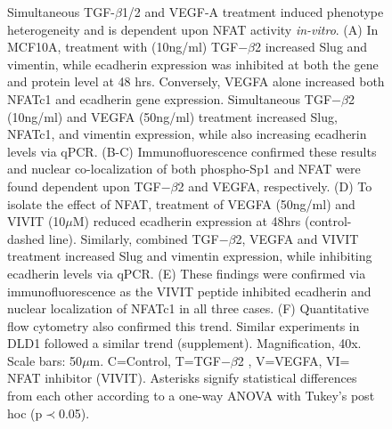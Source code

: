 \documentclass[11pt,letterpaper]{article}
\begin{document}
\clearpage

\begin{figure}
\caption{Simultaneous TGF-$\beta$1/2 and VEGF-A treatment induced phenotype heterogeneity and is dependent upon NFAT activity \emph{in-vitro}.  (A) In MCF10A, treatment with (10ng/ml) TGF$-\beta$2 increased Slug and vimentin, while ecadherin expression was inhibited at both the gene and protein level at 48 hrs.  Conversely, VEGFA alone increased both NFATc1 and ecadherin gene expression.  Simultaneous TGF$-\beta$2 (10ng/ml) and VEGFA (50ng/ml) treatment increased Slug, NFATc1, and vimentin expression, while also increasing ecadherin levels via qPCR.  (B-C)  Immunofluorescence confirmed these results and nuclear co-localization of both phospho-Sp1 and NFAT were found dependent upon TGF$-\beta$2 and VEGFA, respectively. (D) To isolate the effect of NFAT, treatment of VEGFA (50ng/ml) and VIVIT (10$\mu$M) reduced ecadherin expression at 48hrs (control-dashed line).  Similarly, combined TGF$-\beta$2, VEGFA and VIVIT treatment increased Slug and vimentin expression, while inhibiting ecadherin levels via qPCR.  (E) These findings were confirmed via immunofluorescence as the VIVIT peptide inhibited ecadherin and nuclear localization of NFATc1 in all three cases.  (F)  Quantitative flow cytometry also confirmed this trend.  Similar experiments in DLD1 followed a similar trend (supplement).  Magnification, 40x. Scale bars: 50$\mu$m.  C=Control, T=TGF$-\beta$2 , V=VEGFA, VI= NFAT inhibitor (VIVIT).  Asterisks signify statistical differences from each other according to a one-way ANOVA with Tukey's post hoc (p$\prec$0.05).}\label{fg:F5}
\end{figure}

\clearpage
\end{document}
